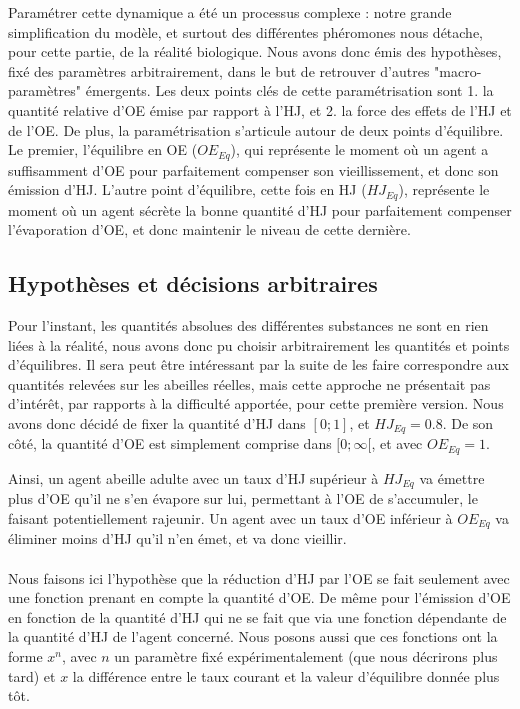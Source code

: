 	Paramétrer cette dynamique a été un processus complexe : notre grande simplification du modèle, et surtout des différentes phéromones nous détache, pour cette partie, de la réalité biologique. Nous avons donc émis des hypothèses, fixé des paramètres arbitrairement, dans le but de retrouver d'autres "macro-paramètres" émergents. Les deux points clés de cette paramétrisation sont 1. la quantité relative d'OE émise par rapport à l'HJ, et 2. la force des effets de l'HJ et de l'OE. De plus, la paramétrisation s'articule autour de deux points d'équilibre. Le premier, l'équilibre en OE ($OE_{Eq}$), qui représente le moment où un agent a suffisamment d'OE pour parfaitement compenser son vieillissement, et donc son émission d'HJ. L'autre point d'équilibre, cette fois en HJ ($HJ_{Eq}$), représente le moment où un agent sécrète la bonne quantité d'HJ pour parfaitement compenser l'évaporation d'OE, et donc maintenir le niveau de cette dernière.
	
	\subsection{Hypothèses et décisions arbitraires}
	Pour l'instant, les quantités absolues des différentes substances ne sont en rien liées à la réalité, nous avons donc pu choisir arbitrairement les quantités et points d'équilibres. Il sera peut être intéressant par la suite de les faire correspondre aux quantités relevées sur les abeilles réelles, mais cette approche ne présentait pas d'intérêt, par rapports à la difficulté apportée, pour cette première version. Nous avons donc décidé de fixer la quantité d'HJ dans $[0;1]$, et $HJ_{Eq} = 0.8$. De son côté, la quantité d'OE est simplement comprise dans $[0;\infty[$, et avec $OE_{Eq} = 1$. 
	
	Ainsi, un agent abeille adulte avec un taux d'HJ supérieur à $HJ_{Eq}$ va émettre plus d'OE qu'il ne s'en évapore sur lui, permettant à l'OE de s'accumuler, le faisant potentiellement rajeunir. Un agent avec un taux d'OE inférieur à $OE_{Eq}$ va éliminer moins d'HJ qu'il n'en émet, et va donc vieillir.
	
	\paragraph{}
	Nous faisons ici l'hypothèse que la réduction d'HJ par l'OE se fait seulement avec une fonction prenant en compte la quantité d'OE. De même pour l'émission d'OE en fonction de la quantité d'HJ qui ne se fait que via une fonction dépendante de la quantité d'HJ de l'agent concerné. Nous posons aussi que ces fonctions ont la forme $x^n$, avec $n$ un paramètre fixé expérimentalement (que nous décrirons plus tard) et $x$ la différence entre le taux courant et la valeur d'équilibre donnée plus tôt.
	
